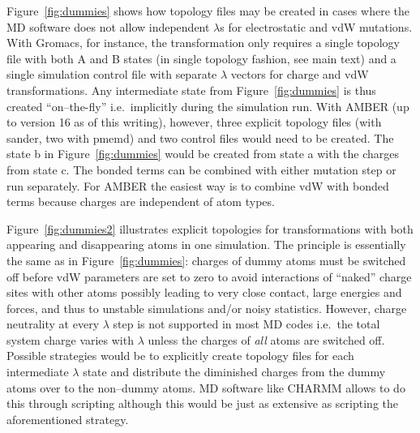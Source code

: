 \documentclass[journal=jctcce,manuscript=suppinfo]{achemso}
\begin{document}
Figure~\ref{fig:dummies} shows how topology files may be created in
cases where the MD software does not allow independent $\lambda$s
for electrostatic and vdW mutations.  With Gromacs, for instance, the
transformation only requires a single topology file with both A and B
states (in single topology fashion, see main text) and a single
simulation control file with separate $\lambda$ vectors for charge and
vdW transformations.  Any intermediate state from
Figure~\ref{fig:dummies} is thus created ``on--the-fly'' i.e.\
implicitly during the simulation run.  With AMBER (up to version 16 as
of this writing), however, three explicit topology files (with sander,
two with pmemd) and two control files would need to be created.  The
state b in Figure~\ref{fig:dummies} would be created from state a with
the charges from state c.  The bonded terms can be combined with
either mutation step or run separately.  For AMBER the easiest way is to
combine vdW with bonded terms because charges are independent of atom
types.

Figure~\ref{fig:dummies2} illustrates explicit topologies for
transformations with both appearing and disappearing atoms in one simulation.  
The principle is essentially the same as in Figure~\ref{fig:dummies}:
charges of dummy atoms must be switched off before vdW parameters are
set to zero to avoid interactions of ``naked'' charge sites with other
atoms possibly leading to very close contact, large energies and
forces, and thus to unstable simulations and/or noisy statistics.
However, charge neutrality at every $\lambda$ step is not supported in
most MD codes i.e.\ the total system charge varies with $\lambda$
unless the charges of \emph{all} atoms are switched off.  Possible
strategies would be to explicitly create topology files for each
intermediate $\lambda$ state and distribute the diminished charges from
the dummy atoms over to the non--dummy atoms.  MD software like CHARMM
allows to do this through scripting although this would be just as
extensive as scripting the aforementioned strategy.
\end{document}
